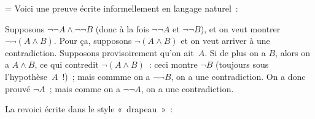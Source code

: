 \documentclass[12pt,a4paper]{article}
\theoremstyle{definition}
\newif\ifcorrige
\newenvironment{corrige}%
{\ifcorrige\relax\else\setbox0=\vbox\bgroup\fi%
\smallbreak\footnotesize\noindent{\underbar{\textit{Corrigé.}}\quad}}
{{\hbox{}\nobreak\hfill\checkmark}%
\ifcorrige\relax\else\egroup\fi\par}
\begin{document}
\begin{corrige}
Voici une preuve écrite informellement en langage naturel :

Supposons $\neg\neg A\land\neg\neg B$ (donc à la fois $\neg\neg A$ et
$\neg\neg B$), et on veut montrer $\neg\neg (A\land B)$.  Pour ça,
supposons $\neg (A\land B)$ et on veut arriver à une contradiction.
Supposons provisoirement qu'on ait $A$.  Si de plus on a $B$, alors on
a $A\land B$, ce qui contredit $\neg (A\land B)$ : ceci montre $\neg
B$ (toujours sous l'hypothèse $A$ !) ; mais commme on a $\neg\neg B$,
on a une contradiction.  On a donc prouvé $\neg A$ ; mais comme on a
$\neg\neg A$, on a une contradiction.

La revoici écrite dans le style « drapeau » :
\bgroup\normalsize
\begin{footnotesize}
\begin{flagderiv}
\end{flagderiv}
\end{footnotesize}
\egroup


\end{corrige}
\end{document}
